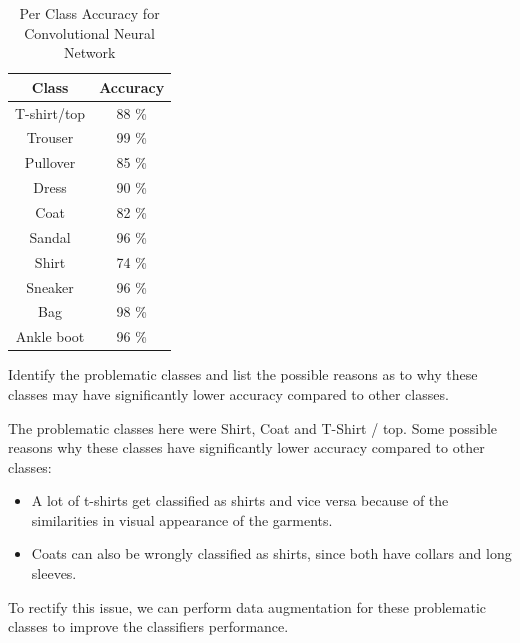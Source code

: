 \begin{table}[H]
\centering
\begin{tabular}{ |c|c| } 
 \hline
 \textbf{Class} & \textbf{Accuracy} \\
 \hline
 T-shirt/top & 88 \% \\
 Trouser & 99 \% \\
 Pullover & 85 \% \\
 Dress & 90 \% \\
 Coat & 82 \% \\
 Sandal & 96 \% \\
 Shirt & 74 \% \\
 Sneaker & 96 \% \\
 Bag & 98 \% \\
 Ankle boot & 96 \% \\
 \hline
\end{tabular}
\caption{Per Class Accuracy for Convolutional Neural Network}
\label{nnCA}
\end{table}

Identify the problematic classes and list the possible reasons as to why these classes may have significantly lower accuracy compared to other classes.

The problematic classes here were Shirt, Coat and T-Shirt / top. Some possible reasons why these classes have significantly lower accuracy compared to other classes:
\begin{itemize}
	\item A lot of t-shirts get classified as shirts and vice versa because of the similarities in visual appearance of the garments.
	\item Coats can also be wrongly classified as shirts, since both have collars and long sleeves.
\end{itemize}

To rectify this issue, we can perform data augmentation for these problematic classes to improve the classifiers performance.